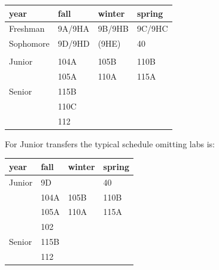 \documentclass[12pt]{article}
\begin{document}
\begin{table}
\begin{center}
\begin{tabular}{|l|l|l|l|}
\hline
year      & fall    & winter & spring  \\
\hline
Freshman  & 9A/9HA  & 9B/9HB  & 9C/9HC \\
\hline
Sophomore & 9D/9HD  & (9HE)   & 40     \\
          &         &         &        \\
\hline
Junior    & 104A & 105B & 110B\\
          & 105A & 110A & 115A\\
\hline
Senior    & 115B &        & \\
          & 110C &        & \\
          & 112  &        & \\

\hline 
\end{tabular}
\end{center}
\end{table}
For Junior transfers the typical schedule omitting labs is:
\begin{table}
\begin{center}
\begin{tabular}{|l|l|l|l|}
\hline
year      & fall    & winter & spring  \\
\hline
Junior    & 9D  &    & 40     \\
          & 104A & 105B & 110B\\
          & 105A & 110A & 115A\\
          & 102 &       & \\

\hline
Senior    & 115B &        & \\
          & 112  &        & \\

\hline 
\end{tabular}
\end{center}
\end{table}
 
\end{document}
